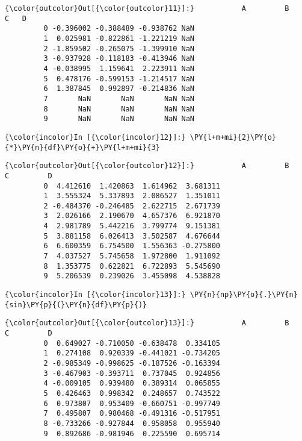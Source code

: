             \begin{Verbatim}[commandchars=\\\{\}]
{\color{outcolor}Out[{\color{outcolor}11}]:}           A         B         C   D
         0 -0.396002 -0.388489 -0.938762 NaN
         1  0.025981 -0.822861 -1.221219 NaN
         2 -1.859502 -0.265075 -1.399910 NaN
         3 -0.937928 -0.118183 -0.413946 NaN
         4 -0.038995  1.159641  2.223911 NaN
         5  0.478176 -0.599153 -1.214517 NaN
         6  1.387845  0.992897 -0.214836 NaN
         7       NaN       NaN       NaN NaN
         8       NaN       NaN       NaN NaN
         9       NaN       NaN       NaN NaN
\end{Verbatim}
        
    \begin{Verbatim}[commandchars=\\\{\}]
{\color{incolor}In [{\color{incolor}12}]:} \PY{l+m+mi}{2}\PY{o}{*}\PY{n}{df}\PY{o}{+}\PY{l+m+mi}{3}
\end{Verbatim}

            \begin{Verbatim}[commandchars=\\\{\}]
{\color{outcolor}Out[{\color{outcolor}12}]:}           A         B         C         D
         0  4.412610  1.420863  1.614962  3.681311
         1  3.555324  5.337893  2.086527  1.351011
         2 -0.484370 -0.246485  2.622715  2.671739
         3  2.026166  2.190670  4.657376  6.921870
         4  2.981789  5.442216  3.799774  9.151381
         5  3.881158  6.026413  3.502587  4.676644
         6  6.600359  6.754500  1.556363 -0.275800
         7  4.037527  5.745658  1.972800  1.911092
         8  1.353775  0.622821  6.722893  5.545690
         9  5.206539  0.239026  3.455098  4.538828
\end{Verbatim}
        
    \begin{Verbatim}[commandchars=\\\{\}]
{\color{incolor}In [{\color{incolor}13}]:} \PY{n}{np}\PY{o}{.}\PY{n}{sin}\PY{p}{(}\PY{n}{df}\PY{p}{)}
\end{Verbatim}

            \begin{Verbatim}[commandchars=\\\{\}]
{\color{outcolor}Out[{\color{outcolor}13}]:}           A         B         C         D
         0  0.649027 -0.710050 -0.638478  0.334105
         1  0.274108  0.920339 -0.441021 -0.734205
         2 -0.985349 -0.998625 -0.187526 -0.163394
         3 -0.467903 -0.393711  0.737045  0.924856
         4 -0.009105  0.939480  0.389314  0.065855
         5  0.426463  0.998342  0.248657  0.743522
         6  0.973807  0.953409 -0.660751 -0.997749
         7  0.495807  0.980468 -0.491316 -0.517951
         8 -0.733266 -0.927844  0.958058  0.955940
         9  0.892686 -0.981946  0.225590  0.695714
\end{Verbatim}
        
